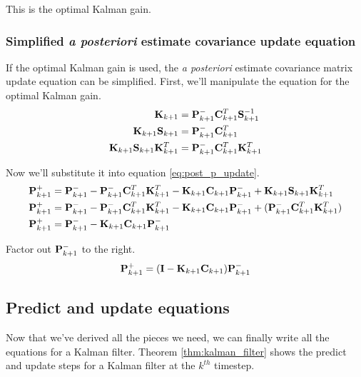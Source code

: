 This is the optimal Kalman gain.

\subsubsection{Simplified \textit{a posteriori} estimate covariance update
  equation}

If the optimal Kalman gain is used, the \textit{a posteriori} estimate
covariance matrix update equation can be simplified. First, we'll manipulate the
equation for the optimal Kalman gain.
\begin{align*}
  \mathbf{K}_{k+1} &= \mathbf{P}_{k+1}^-\mathbf{C}_{k+1}^T\mathbf{S}_{k+1}^{-1} \\
  \mathbf{K}_{k+1}\mathbf{S}_{k+1} &= \mathbf{P}_{k+1}^-\mathbf{C}_{k+1}^T \\
  \mathbf{K}_{k+1}\mathbf{S}_{k+1}\mathbf{K}_{k+1}^T &=
    \mathbf{P}_{k+1}^-\mathbf{C}_{k+1}^T\mathbf{K}_{k+1}^T
\end{align*}

Now we'll substitute it into equation \eqref{eq:post_p_update}.
\begin{align*}
  \mathbf{P}_{k+1}^+ &=
    \mathbf{P}_{k+1}^- - \mathbf{P}_{k+1}^-\mathbf{C}_{k+1}^T\mathbf{K}_{k+1}^T -
    \mathbf{K}_{k+1}\mathbf{C}_{k+1}\mathbf{P}_{k+1}^- +
    \mathbf{K}_{k+1}\mathbf{S}_{k+1}\mathbf{K}_{k+1}^T \\
  \mathbf{P}_{k+1}^+ &=
    \mathbf{P}_{k+1}^- - \mathbf{P}_{k+1}^-\mathbf{C}_{k+1}^T\mathbf{K}_{k+1}^T -
    \mathbf{K}_{k+1}\mathbf{C}_{k+1}\mathbf{P}_{k+1}^- +
    (\mathbf{P}_{k+1}^-\mathbf{C}_{k+1}^T\mathbf{K}_{k+1}^T) \\
  \mathbf{P}_{k+1}^+ &=
    \mathbf{P}_{k+1}^- - \mathbf{K}_{k+1}\mathbf{C}_{k+1}\mathbf{P}_{k+1}^-
\end{align*}

Factor out $\mathbf{P}_{k+1}^-$ to the right.
\begin{equation*}
  \mathbf{P}_{k+1}^+ = (\mathbf{I} - \mathbf{K}_{k+1}\mathbf{C}_{k+1})\mathbf{P}_{k+1}^-
\end{equation*}

\subsection{Predict and update equations}

Now that we've derived all the pieces we need, we can finally write all the
equations for a Kalman filter. Theorem \ref{thm:kalman_filter} shows the predict
and update steps for a Kalman filter at the $k^{th}$ timestep.

